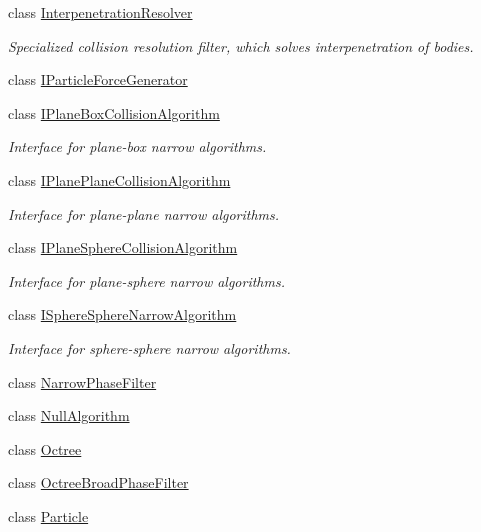 \begin{DoxyCompactItemize}
class \mbox{\hyperlink{classr3_1_1_interpenetration_resolver}{Interpenetration\+Resolver}}
\begin{DoxyCompactList}\small\item\em Specialized collision resolution filter, which solves interpenetration of bodies. \end{DoxyCompactList}\item 
class \mbox{\hyperlink{classr3_1_1_i_particle_force_generator}{I\+Particle\+Force\+Generator}}
\item 
class \mbox{\hyperlink{classr3_1_1_i_plane_box_collision_algorithm}{I\+Plane\+Box\+Collision\+Algorithm}}
\begin{DoxyCompactList}\small\item\em Interface for plane-\/box narrow algorithms. \end{DoxyCompactList}\item 
class \mbox{\hyperlink{classr3_1_1_i_plane_plane_collision_algorithm}{I\+Plane\+Plane\+Collision\+Algorithm}}
\begin{DoxyCompactList}\small\item\em Interface for plane-\/plane narrow algorithms. \end{DoxyCompactList}\item 
class \mbox{\hyperlink{classr3_1_1_i_plane_sphere_collision_algorithm}{I\+Plane\+Sphere\+Collision\+Algorithm}}
\begin{DoxyCompactList}\small\item\em Interface for plane-\/sphere narrow algorithms. \end{DoxyCompactList}\item 
class \mbox{\hyperlink{classr3_1_1_i_sphere_sphere_narrow_algorithm}{I\+Sphere\+Sphere\+Narrow\+Algorithm}}
\begin{DoxyCompactList}\small\item\em Interface for sphere-\/sphere narrow algorithms. \end{DoxyCompactList}\item 
class \mbox{\hyperlink{classr3_1_1_narrow_phase_filter}{Narrow\+Phase\+Filter}}
\item 
class \mbox{\hyperlink{classr3_1_1_null_algorithm}{Null\+Algorithm}}
\item 
class \mbox{\hyperlink{classr3_1_1_octree}{Octree}}
\item 
class \mbox{\hyperlink{classr3_1_1_octree_broad_phase_filter}{Octree\+Broad\+Phase\+Filter}}
\item 
class \mbox{\hyperlink{classr3_1_1_particle}{Particle}}

\end{DoxyCompactItemize}
